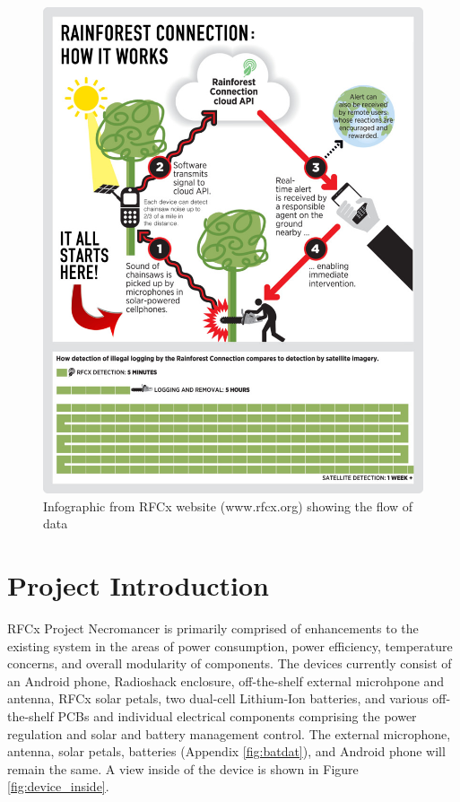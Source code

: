 \documentclass{article}
\numberwithin{figure}{section}
\numberwithin{equation}{section}
\begin{document}
{\begin{figure}[H]
  \centering
  \includegraphics[height=0.76\textwidth]{infographic}
  \caption{Infographic from RFCx website (www.rfcx.org) showing the flow of data}
  \label{fig:infographic}
\end{figure}
\newpage

\section{Project Introduction} \label{sect:intro}
RFCx Project Necromancer is primarily comprised of enhancements to the existing system in the areas of power consumption, power efficiency, temperature concerns, and overall modularity of components. The devices currently consist of an Android phone, Radioshack enclosure, off-the-shelf external microhpone and antenna, RFCx solar petals, two dual-cell Lithium-Ion batteries, and  various off-the-shelf PCBs and individual electrical components comprising the power regulation and solar and battery management control. The external microphone, antenna, solar petals, batteries (Appendix \ref{fig:batdat}), and Android phone will remain the same. A view inside of the device is shown in Figure \ref{fig:device_inside}.

}
\end{document}
